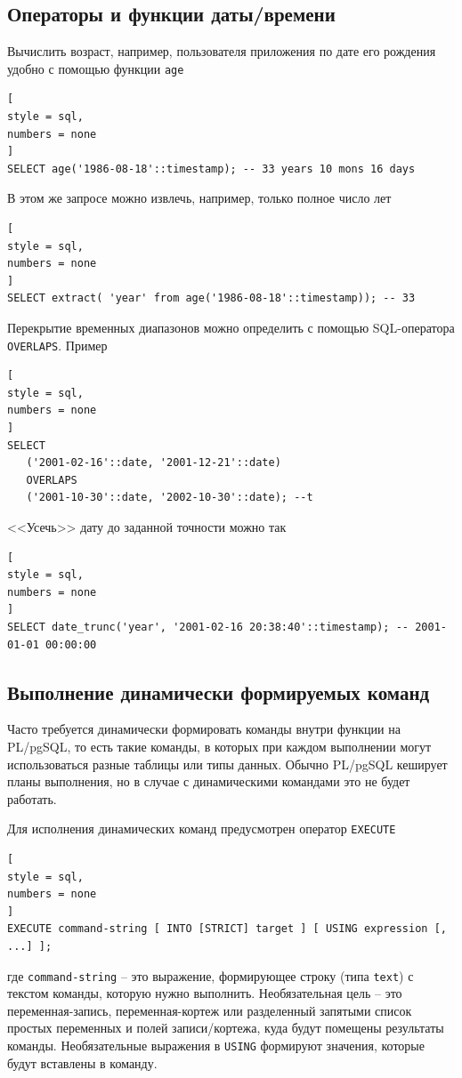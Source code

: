 \documentclass[%
	11pt,
	a4paper,
	utf8,
		]{article}
\begin{document}
\subsection{Операторы и функции даты/времени}

Вычислить возраст, например, пользователя приложения по дате его рождения удобно с помощью функции \texttt{age}
\begin{lstlisting}[
style = sql,
numbers = none
]
SELECT age('1986-08-18'::timestamp); -- 33 years 10 mons 16 days
\end{lstlisting}

В этом же запросе можно извлечь, например, только полное число лет
\begin{lstlisting}[
style = sql,
numbers = none
]
SELECT extract( 'year' from age('1986-08-18'::timestamp)); -- 33
\end{lstlisting}

Перекрытие временных диапазонов можно определить с помощью SQL-оператора \texttt{OVERLAPS}. Пример
\begin{lstlisting}[
style = sql,
numbers = none
]
SELECT
   ('2001-02-16'::date, '2001-12-21'::date)
   OVERLAPS
   ('2001-10-30'::date, '2002-10-30'::date); --t
\end{lstlisting}

<<Усечь>> дату до заданной точности можно так
\begin{lstlisting}[
style = sql,
numbers = none
]
SELECT date_trunc('year', '2001-02-16 20:38:40'::timestamp); -- 2001-01-01 00:00:00
\end{lstlisting}

\subsection{Выполнение динамически формируемых команд}

Часто требуется динамически формировать команды внутри функции на PL/pgSQL, то есть такие команды, в которых при каждом выполнении могут использоваться разные таблицы или типы данных. Обычно PL/pgSQL кеширует планы выполнения, но в случае с динамическими командами это не будет работать.

Для исполнения динамических команд предусмотрен оператор \texttt{EXECUTE}
\begin{lstlisting}[
style = sql,
numbers = none
]
EXECUTE command-string [ INTO [STRICT] target ] [ USING expression [, ...] ];
\end{lstlisting}
где \texttt{command-string} -- это выражение, формирующее строку (типа \texttt{text}) с текстом команды, которую нужно выполнить. Необязательная цель -- это переменная-запись, переменная-кортеж или разделенный запятыми список простых переменных и полей записи/кортежа, куда будут помещены результаты команды. Необязательные выражения в \texttt{USING} формируют значения, которые будут вставлены в команду.
\end{document}
